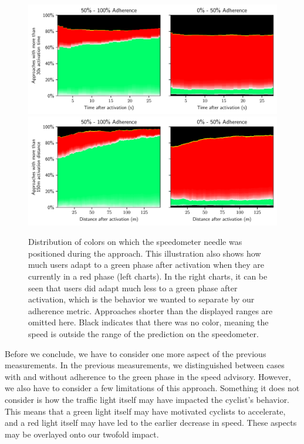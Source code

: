 \begin{figure}[!t]
\caption{Distribution of colors on which the speedometer needle was positioned during the approach. This illustration also shows how much users adapt to a green phase after activation when they are currently in a red phase (left charts). In the right charts, it can be seen that users did adapt much less to a green phase after activation, which is the behavior we wanted to separate by our adherence metric. Approaches shorter than the displayed ranges are omitted here. Black indicates that there was no color, meaning the speed is outside the range of the prediction on the speedometer.}\label{fig:impact-adherence-discussion}
\includegraphics[width=\linewidth]{images/impacts-activation-time.pdf} 
\\
\includegraphics[width=\linewidth]{images/impacts-activation-distance.pdf}
\end{figure}

Before we conclude, we have to consider one more aspect of the previous measurements. In the previous measurements, we distinguished between cases with and without adherence to the green phase in the speed advisory. However, we also have to consider a few limitations of this approach. Something it does not consider is how the traffic light itself may have impacted the cyclist's behavior. This means that a green light itself may have motivated cyclists to accelerate, and a red light itself may have led to the earlier decrease in speed. These aspects may be overlayed onto our twofold impact. 

